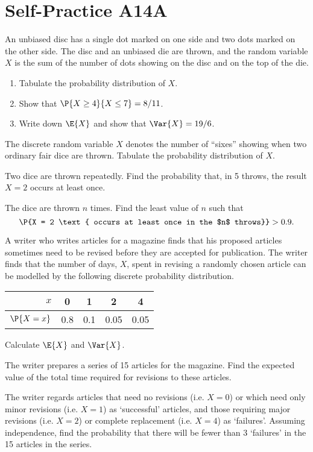 \section{Self-Practice A14A}

\begin{problem}
    An unbiased disc has a single dot marked on one side and two dots marked on the other side. The disc and an unbiased die are thrown, and the random variable $X$ is the sum of the number of dots showing on the disc and on the top of the die.

    \begin{enumerate}
        \item Tabulate the probability distribution of $X$.
        \item Show that $\P{X \geq 4}{X \leq 7} = 8/11$.
        \item Write down $\E{X}$ and show that $\Var{X} = 19/6$.
    \end{enumerate}
\end{problem}

\begin{problem}
    The discrete random variable $X$ denotes the number of ``sixes'' showing when two ordinary fair dice are thrown. Tabulate the probability distribution of $X$.

    Two dice are thrown repeatedly. Find the probability that, in 5 throws, the result $X=2$ occurs at least once.
    
    The dice are thrown $n$ times. Find the least value of $n$ such that \[\P{X = 2 \text{ occurs at least once in the $n$ throws}} > 0.9.\]
\end{problem}

\begin{problem}
    A writer who writes articles for a magazine finds that his proposed articles sometimes need to be revised before they are accepted for publication. The writer finds that the number of days, $X$, spent in revising a randomly chosen article can be modelled by the following discrete probability distribution.

    \begin{table}[H]
        \centering
        \begin{tabular}{|r|c|c|c|c|}
        \hline
        $x$ & 0 & 1 & 2 & 4 \\ \hline
        $\P{X = x}$ & 0.8 & 0.1 & 0.05 & 0.05 \\ \hline
        \end{tabular}
    \end{table}

    Calculate $\E{X}$ and $\Var{X}$.

    The writer prepares a series of 15 articles for the magazine. Find the expected value of the total time required for revisions to these articles.

    The writer regards articles that need no revisions (i.e. $X = 0$) or which need only minor revisions (i.e. $X = 1$) as `successful' articles, and those requiring major revisions (i.e. $X = 2$) or complete replacement (i.e. $X = 4$) as `failures'. Assuming independence, find the probability that there will be fewer than 3 `failures' in the 15 articles in the series.
\end{problem}

